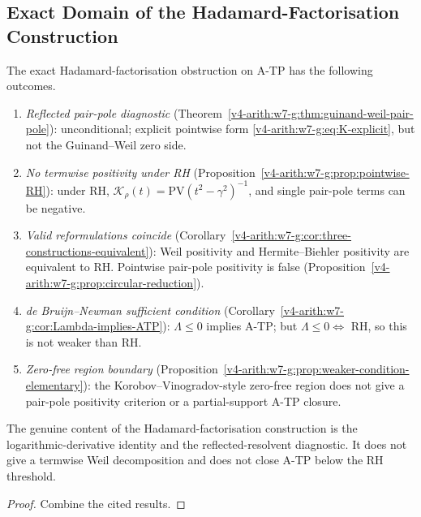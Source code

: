 \subsection{Exact Domain of the Hadamard-Factorisation Construction}
\label{v4-arith:w7-g:zero-density:form}

\begin{theorem}
\label{v4-arith:w7-g:thm:honest-form}
The exact Hadamard-factorisation obstruction on
A-TP has the following outcomes.
\begin{enumerate}
\item \emph{Reflected pair-pole diagnostic}
(Theorem~\ref{v4-arith:w7-g:thm:guinand-weil-pair-pole}): unconditional;
explicit pointwise form \eqref{v4-arith:w7-g:eq:K-explicit}, but not
the Guinand--Weil zero side.
\item \emph{No termwise positivity under RH}
(Proposition~\ref{v4-arith:w7-g:prop:pointwise-RH}): under RH,
\(\mathcal{K}_{\rho}(t)=\mathrm{PV}(t^{2}-\gamma^{2})^{-1}\), and
single pair-pole terms can be negative.
\item \emph{Valid reformulations coincide}
(Corollary~\ref{v4-arith:w7-g:cor:three-constructions-equivalent}): Weil positivity
and Hermite--Biehler positivity are equivalent to RH. Pointwise
pair-pole positivity is false
(Proposition~\ref{v4-arith:w7-g:prop:circular-reduction}).
\item \emph{de Bruijn--Newman sufficient condition}
(Corollary~\ref{v4-arith:w7-g:cor:Lambda-implies-ATP}): \(\Lambda\leq 0\)
implies A-TP; but \(\Lambda\leq 0\Leftrightarrow\) RH, so this is not
weaker than RH.
\item \emph{Zero-free region boundary}
(Proposition~\ref{v4-arith:w7-g:prop:weaker-condition-elementary}): the
Korobov--Vinogradov-style zero-free region does not give a
pair-pole positivity criterion or a partial-support A-TP closure.
\end{enumerate}
The genuine content of the Hadamard-factorisation construction is the
logarithmic-derivative identity and the reflected-resolvent diagnostic.
It does not give a termwise Weil decomposition and does not close A-TP
below the RH threshold.
\end{theorem}

\begin{proof}
Combine the cited results.
\end{proof}

